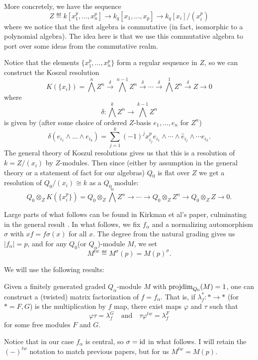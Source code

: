 \documentclass[12pt]{article}
\begin{document}
More concretely, we have the sequence
\[Z\eqdef k[x_1^p,\dots,x_n^p]\to k_q[x_1,\dots,x_p]\to k_q[x_i]/(x_i^p)\]
where we notice that the first algebra is commutative (in fact, isomorphic to a polynomial algebra). The idea here is that we use this commutative algebra to port over some ideas from the commutative realm.

Notice that the elements $\{x_1^p,\dots, x_n^p\}$ form a regular sequence in $Z$, so we can construct the Koszul resolution
\[K(\{x_i\})=\bigwedge^n Z^n\xrightarrow{\delta} \bigwedge^{n-1}Z^n\xrightarrow{\delta}\cdots\xrightarrow{\delta}\bigwedge^1 Z^n\xrightarrow{\delta} Z\to 0\]
where
\[\delta:\bigwedge^k Z^n\to \bigwedge^{k-1}Z^n\]
is given by (after some choice of ordered $Z$-basis $e_1,\dots,e_n$ for $Z^n$)
\[\delta(e_{i_1}\wedge\dots\wedge e_{i_k})=\sum_{j=1}^k (-1)^jx_{i_j}^pe_{i_1}\wedge\cdots\wedge\hat e_{i_j}\wedge\cdots e_{i_k}.\]
The general theory of Koszul resolutions gives us that this is a resolution of $k=Z/(x_i)$ by $Z$-modules. Then since (either by assumption in the general theory or a statement of fact for our algebras) $Q_0$ is flat over $Z$ we get a resolution of $Q_0/(x_i)\cong k$ as a $Q_0$ module:
\[Q_0\otimes_Z K(\{x_i^p\})=Q_0\otimes_Z \bigwedge^n Z^n\to\cdots\to Q_0\otimes_Z Z^n\to Q_0\otimes_Z Z\to 0.\]

Large parts of what follows can be found in Kirkman et al's paper, culminating in the general result \cite[Thm. 4.7]{kirkman13}. In what follows, we fix $f_\alpha$ and a normalizing automorphism $\sigma$ with $xf=f\sigma(x)$ for all $x$. The degree from the natural grading gives us $|f_\alpha|=p$, and for any $Q_0$(or $Q_\alpha$)-module $M$, we set
\[M^{tw}\eqdef M^\sigma(p)=M(p)^\sigma.\]

We will use the following results:
\begin{prop}
    Given a finitely generated graded $Q_\alpha$-module $M$ with $\operatorname{projdim}_{Q_0}(M)=1$, one can construct a (twisted) matrix factorization of $f=f_\alpha$. That is, if $\lambda_f^*:\ast\to \ast$ (for $\ast=F,G$) is the multiplication by $f$ map, there exist maps $\varphi$ and $\tau$ such that
    \[\varphi\tau = \lambda_f^G\quad\text{and}\quad \tau\varphi^{tw}=\lambda_f^F\]
    for some free modules $F$ and $G$.
\end{prop}

\begin{rmk}
Notice that in our case $f_\alpha$ is central, so $\sigma=\operatorname{id}$ in what follows. I will retain the $(-)^{tw}$ notation to match previous papers, but for us $M^{tw}=M(p).$
\end{rmk}
\end{document}
